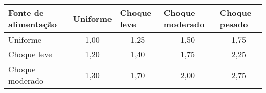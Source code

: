 \begin{table}[]
\begin{tabular}{lcccc}
\hline
\multicolumn{1}{|l|}{\textbf{Fonte de alimentação}} & \multicolumn{1}{l|}{\textbf{Uniforme}} & \multicolumn{1}{l|}{\textbf{Choque leve}} & \multicolumn{1}{l|}{\textbf{Choque moderado}} & \multicolumn{1}{l|}{\textbf{Choque pesado}} \\ \hline
Uniforme                                            & 1,00                                   & 1,25                                      & 1,50                                          & 1,75                                        \\
Choque leve                                         & 1,20                                   & 1,40                                      & 1,75                                          & 2,25                                        \\ \hline
\multicolumn{1}{|l|}{Choque moderado}               & \multicolumn{1}{c|}{1,30}              & \multicolumn{1}{c|}{1,70}                 & \multicolumn{1}{c|}{2,00}                     & \multicolumn{1}{c|}{2,75}                   \\ \hline
\end{tabular}
\end{table}